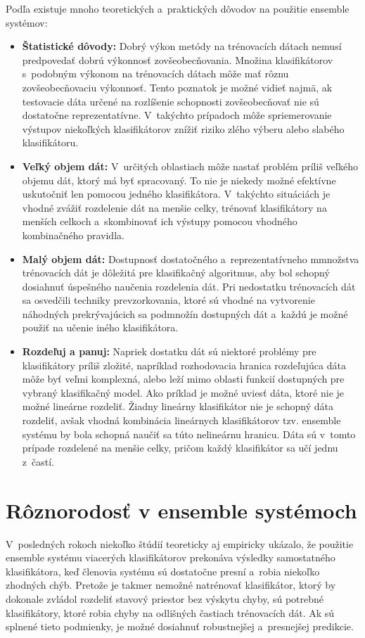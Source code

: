 Podľa \cite{polikar} existuje mnoho teoretických a~praktických dôvodov na použitie ensemble systémov:
\begin{itemize}
	\item \textbf{Štatistické dôvody:} Dobrý výkon metódy na trénovacích dátach nemusí predpovedať dobrú výkonnosť zovšeobecňovania. Množina klasifikátorov s~podobným výkonom na trénovacích dátach môže mať rôznu zovšeobecňovaciu výkonnosť. Tento poznatok je možné vidieť najmä, ak testovacie dáta určené na rozlíšenie schopnosti zovšeobecňovať nie sú dostatočne reprezentatívne. V~takýchto prípadoch môže spriemerovanie výstupov niekoľkých klasifikátorov znížiť riziko zlého výberu alebo slabého klasifikátoru. 
	\item \textbf{Veľký objem dát:} V~určitých oblastiach môže nastať problém príliš veľkého objemu dát, ktorý má byť spracovaný. To nie je niekedy možné efektívne uskutočniť len pomocou jedného klasifikátora. V~takýchto situáciách je vhodné zvážiť rozdelenie dát na menšie celky, trénovať klasifikátory na menších celkoch a~skombinovať ich výstupy pomocou vhodného kombinačného pravidla.
	\item \textbf{Malý objem dát:} Dostupnosť dostatočného a~reprezentatívneho mmnožstva trénovacích dát je dôležitá pre klasifikačný algoritmus, aby bol schopný dosiahnuť úspešného naučenia rozdelenia dát. Pri nedostatku trénovacích dát sa osvedčili techniky prevzorkovania, ktoré sú vhodné na vytvorenie náhodných prekrývajúcich sa podmnožín dostupných dát a~každú je možné použiť na učenie iného klasifikátora.
	\item \textbf{Rozdeľuj a panuj:} Napriek dostatku dát sú niektoré problémy pre klasifikátory príliš zložité, napríklad rozhodovacia hranica rozdeľujúca dáta môže byť veľmi komplexná, alebo leží mimo oblasti funkcií dostupných pre vybraný klasifikačný model. Ako príklad je možné uviesť dáta, ktoré nie je možné lineárne rozdeliť. Žiadny lineárny klasifikátor nie je schopný dáta rozdeliť, avšak vhodná kombinácia lineárnych klasifikátorov tzv. ensemble systému by bola schopná naučiť sa túto nelineárnu hranicu. Dáta sú v~tomto prípade rozdelené na menšie celky, pričom každý klasifikátor sa učí jednu z~častí.
\end{itemize}

\section{Rôznorodosť v ensemble systémoch}

V~posledných rokoch niekoľko štúdií teoreticky \cite{teoret1} aj empiricky \cite{empiric1} ukázalo, že použitie ensemble systému viacerých klasifikátorov prekonáva výsledky samostatného klasifikátora, keď členovia systému sú dostatočne presní a~robia niekoľko zhodných chýb. 
Pretože je takmer nemožné natrénovať klasifikátor, ktorý by dokonale zvládol rozdeliť stavový priestor bez výskytu chyby, sú potrebné klasifikátory, ktoré robia chyby na odlišných častiach trénovacích dát. Ak sú splnené tieto podmienky, je možné dosiahnuť robustnejšej a~presnejšej predikcie. 

